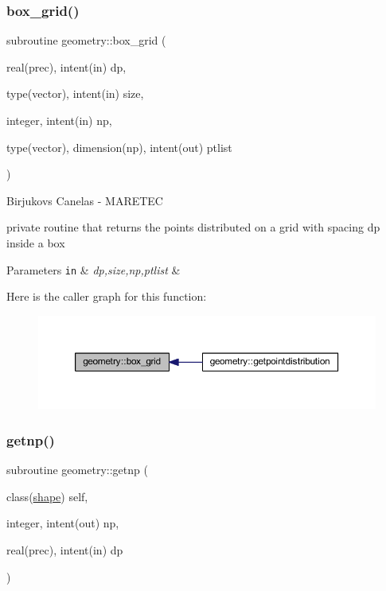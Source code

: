 \subsubsection{\texorpdfstring{box\+\_\+grid()}{box\_grid()}}
{\footnotesize\ttfamily subroutine geometry\+::box\+\_\+grid (\begin{DoxyParamCaption}\item[{real(prec), intent(in)}]{dp,  }\item[{type(vector), intent(in)}]{size,  }\item[{integer, intent(in)}]{np,  }\item[{type(vector), dimension(np), intent(out)}]{ptlist }\end{DoxyParamCaption})\hspace{0.3cm}{\ttfamily [private]}}



Birjukovs Canelas -\/ M\+A\+R\+E\+T\+EC 

private routine that returns the points distributed on a grid with spacing dp inside a box 
\begin{DoxyParams}[1]{Parameters}
\mbox{\tt in}  & {\em dp,size,np,ptlist} & \\
\hline
\end{DoxyParams}
Here is the caller graph for this function\+:\nopagebreak
\begin{figure}[H]
\begin{center}
\leavevmode
\includegraphics[width=350pt]{namespacegeometry_ab7f40c137db819829d3110dac77a2977_icgraph}
\end{center}
\end{figure}
\mbox{\label{namespacegeometry_ad14d7800ac13b9a6722ac96b06ce94c9}} 
\subsubsection{\texorpdfstring{getnp()}{getnp()}}
{\footnotesize\ttfamily subroutine geometry\+::getnp (\begin{DoxyParamCaption}\item[{class(\mbox{\hyperlink{structgeometry_1_1shape}{shape}})}]{self,  }\item[{integer, intent(out)}]{np,  }\item[{real(prec), intent(in)}]{dp }\end{DoxyParamCaption})\hspace{0.3cm}{\ttfamily [private]}}



